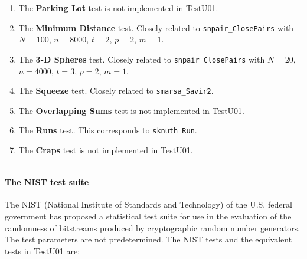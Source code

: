 \begin{enumerate}
\item The {\bf Parking Lot} test is not implemented in TestU01. 

\item The {\bf Minimum Distance} test. Closely related
  to {\tt snpair\_ClosePairs}  with
 $N=100$, $n=8000$, $t=2$, $p=2$, $m=1$.

\item The {\bf 3-D Spheres} test. Closely related
  to {\tt snpair\_ClosePairs}  with
 $N=20$, $n=4000$, $t=3$, $p=2$, $m=1$. 

\item The {\bf Squeeze} test.  Closely related
  to {\tt smarsa\_Savir2}.

\item The {\bf Overlapping Sums} test  is not implemented in TestU01.

\item The {\bf Runs} test.  This corresponds to  {\tt sknuth\_Run}.

\item The {\bf Craps} test  is not implemented in TestU01. 

\end{enumerate}


\bigskip
\hrule

\paragraph{The NIST test suite}

The NIST (National Institute of Standards and Technology) of the U.S.
federal government has proposed a statistical test suite \cite{rRUK01a}
for use in the evaluation of the randomness of bitstreams
produced by cryptographic random number generators.
%
The test parameters are not predetermined.
The NIST tests and the equivalent tests in TestU01 are:

